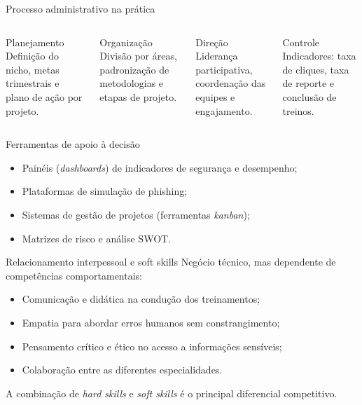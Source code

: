 \documentclass[aspectratio=169,12pt]{beamer}
\begin{document}
\begin{frame}{Processo administrativo na prática}
  \begin{columns}[t]
      \begin{block}{Planejamento}
        Definição do nicho, metas trimestrais e plano de ação por projeto.
      \end{block}
      \begin{block}{Organização}
        Divisão por áreas, padronização de metodologias e etapas de projeto.
      \end{block}
      \begin{block}{Direção}
        Liderança participativa, coordenação das equipes e engajamento.
      \end{block}
      \begin{block}{Controle}
        Indicadores: taxa de cliques, taxa de reporte e conclusão de treinos.
      \end{block}
  \end{columns}
\end{frame}

\begin{frame}{Ferramentas de apoio à decisão}
  \begin{itemize}
    \item Painéis (\textit{dashboards}) de indicadores de segurança e desempenho;
    \item Plataformas de simulação de phishing;
    \item Sistemas de gestão de projetos (ferramentas \textit{kanban});
    \item Matrizes de risco e análise SWOT.
  \end{itemize}
\end{frame}

\begin{frame}{Relacionamento interpessoal e soft skills}
  Negócio técnico, mas dependente de competências comportamentais:
  \begin{itemize}
    \item Comunicação e didática na condução dos treinamentos;
    \item Empatia para abordar erros humanos sem constrangimento;
    \item Pensamento crítico e ético no acesso a informações sensíveis;
    \item Colaboração entre as diferentes especialidades.
  \end{itemize}

  \vspace{0.2cm}
  A combinação de \textit{hard skills} e \textit{soft skills} é o principal
  diferencial competitivo.
\end{frame}
\end{document}

